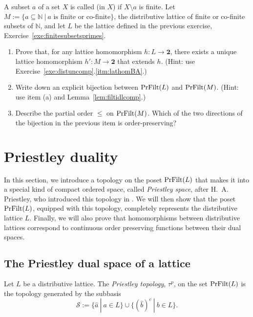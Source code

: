 \begin{exercise}\label{exe:fincofsubsetsprimes}
A subset $a$ of a set $X$ is called  (in $X$) if $X \setminus a$ is finite. Let $M := \{a \subseteq \mathbb{N} \ | \ a \text{ is finite or co-finite}\}$, the distributive lattice of finite or co-finite subsets of $\mathbb{N}$, and let $L$ be the lattice defined in the previous exercise, Exercise~\ref{exe:finitesubsetsprimes}.
\begin{enumerate}
\item Prove that, for any lattice homomorphism $h \colon L \to \mathbf{2}$, there exists a unique lattice homomorphism $h' \colon M \to \mathbf{2}$ that extends $h$. (Hint: use Exercise~\ref{exe:distuncomp}.\ref{itm:lathomBA}.)
\item Write down an explicit bijection between $\mathrm{PrFilt}(L)$ and $\mathrm{PrFilt}(M)$. (Hint: use item (a) and Lemma~\ref{lem:filtidlcomp}.)
\item Describe the partial order $\leq$ on $\mathrm{PrFilt}(M)$. Which of the two directions of the bijection in the previous item is order-preserving?
\end{enumerate}
\end{exercise}


\section{Priestley duality}\label{sec:topologize}
In this section, we introduce a topology on the poset $\mathrm{PrFilt}(L)$ that makes it into a special kind of compact ordered space, called \emph{Priestley space}, after H.~A. Priestley, who introduced this topology in \cite{Pri1970}. We will then show that the poset $\mathrm{PrFilt}(L)$, equipped with this topology, completely represents the distributive lattice $L$. Finally, we will also prove that homomorphisms between distributive lattices correspond to continuous order preserving functions between their dual spaces.

\subsection*{The Priestley dual space of a lattice}
\begin{definition}\label{def:Priestleydual}
Let $L$ be a distributive lattice. The \emph{Priestley topology}, $\tau^p$, on the set $\mathrm{PrFilt}(L)$ is the topology generated by the subbasis
\[ \mathcal{S} := \{\widehat{a} \ | \ a \in L\} \cup \{(\widehat{b})^c \ | \ b \in L\}.\]
\end{definition}


